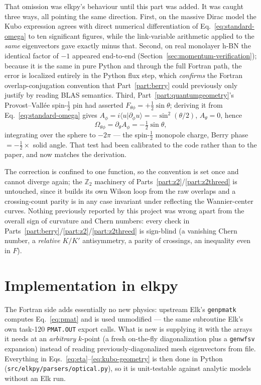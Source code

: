 \documentclass[11pt]{article}
\begin{document}
That omission was elkpy's behaviour until this part was added. It was caught three ways,
all pointing the same direction. First, on the massive Dirac model the Kubo expression
agrees with direct numerical differentiation of Eq.~\eqref{eq:standard-omega} to ten
significant figures, while the link-variable arithmetic applied to the \emph{same}
eigenvectors gave exactly minus that. Second, on real monolayer h-BN the identical factor
of $-1$ appeared end-to-end (Section~\ref{sec:momentum-verification}); because it is the
same in pure Python and through the full Fortran path, the error is localized entirely in
the Python flux step, which \emph{confirms} the Fortran overlap-conjugation convention
that Part~\ref{part:berry} could previously only justify by reading BLAS semantics. Third,
Part~\ref{part:quantumgeometry}'s Provost--Vall\'ee spin-$\tfrac12$ pin had asserted
$F_{\theta\phi}=+\tfrac12\sin\theta$; deriving it from Eq.~\eqref{eq:standard-omega} gives
$A_\phi=i\langle u|\partial_\phi u\rangle=-\sin^2(\theta/2)$, $A_\theta=0$, hence
\begin{equation}
  \Omega_{\theta\phi}=\partial_\theta A_\phi = -\tfrac12\sin\theta,
\end{equation}
integrating over the sphere to $-2\pi$ --- the spin-$\tfrac12$ monopole charge, Berry
phase $=-\tfrac12\times$ solid angle. That test had been calibrated to the code rather
than to the paper, and now matches the derivation.

The correction is confined to one function, so the convention is set once and cannot
diverge again; the $\mathbb Z_2$ machinery of Parts~\ref{part:z2}/\ref{part:z2threed} is
untouched, since it builds its own Wilson loop from the raw overlaps and a crossing-count
parity is in any case invariant under reflecting the Wannier-center curves. Nothing
previously reported by this project was wrong apart from the overall sign of curvature and
Chern numbers: every check in Parts~\ref{part:berry}/\ref{part:z2}/\ref{part:z2threed} is
sign-blind (a vanishing Chern number, a \emph{relative} $K/K'$ antisymmetry, a parity of
crossings, an inequality even in $F$).

\section{Implementation in elkpy}

The Fortran side adds essentially no new physics: upstream Elk's \texttt{genpmatk}
computes Eq.~\eqref{eq:pmat} and is used unmodified --- the same subroutine Elk's own
task-120 \texttt{PMAT.OUT} export calls. What is new is supplying it with the arrays it
needs at an \emph{arbitrary} $k$-point (a fresh on-the-fly diagonalization plus a
\texttt{genwfsv} expansion) instead of reading previously-diagonalized mesh eigenvectors
from file. Everything in Eqs.~\eqref{eq:eta}--\eqref{eq:kubo-geometry} is then done in
Python (\texttt{src/elkpy/parsers/optical.py}), so it is unit-testable against analytic
models without an Elk run.
\end{document}
